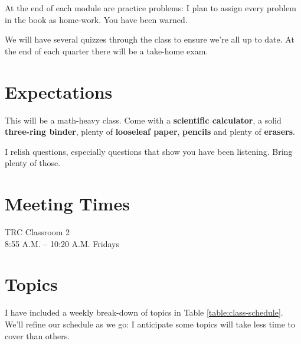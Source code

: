 \documentclass[11pt, oneside]{article}   	%
\begin{document}
At the end of each module are practice problems: I plan to assign every problem in the book as home-work. You have been warned.

We will have several quizzes through the class to ensure we're all up to date. At the end of each quarter there will be a take-home exam.

\section{Expectations}
This will be a math-heavy class. Come with a \textbf{scientific calculator}, a solid \textbf{three-ring binder}, plenty of \textbf{looseleaf paper}, \textbf{pencils} and plenty of \textbf{erasers}. 

I relish questions, especially questions that show you have been listening. Bring plenty of those.

\section{Meeting Times}
TRC Classroom 2       \\
8:55 A.M. -- 10:20 A.M. Fridays \\ 

\section{Topics}
I have included a weekly break-down of topics in Table \ref{table:class-schedule}.
We'll refine our schedule as we go: I anticipate some topics will take less time to cover than others.
\end{document}
